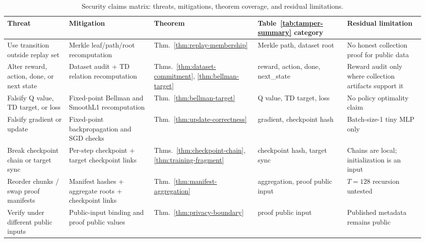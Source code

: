 \begin{table}[!t]
\centering
\small
\caption{Security claims matrix: threats, mitigations, theorem coverage, and residual limitations.}
\label{tab:security-claims}
\begin{tabular}{p{2.8cm} p{3.8cm} p{1.8cm} p{2.8cm} p{3.6cm}}
\toprule
\textbf{Threat} & \textbf{Mitigation} & \textbf{Theorem} &
\textbf{Table~\ref{tab:tamper-summary} category} & \textbf{Residual limitation} \\
\midrule
Use transition outside replay set &
Merkle leaf/path/root recomputation &
Thm.~\ref{thm:replay-membership} &
Merkle path, dataset root &
No honest collection proof for public data \\
\midrule
Alter reward, action, done, or next state &
Dataset audit + TD relation recomputation &
Thms.~\ref{thm:dataset-commitment}, \ref{thm:bellman-target} &
reward, action, done, next\_state &
Reward audit only where collection artifacts support it \\
\midrule
Falsify Q value, TD target, or loss &
Fixed-point Bellman and SmoothL1 recomputation &
Thm.~\ref{thm:bellman-target} &
Q value, TD target, loss &
No policy optimality claim \\
\midrule
Falsify gradient or update &
Fixed-point backpropagation and SGD checks &
Thm.~\ref{thm:update-correctness} &
gradient, checkpoint hash &
Batch-size-1 tiny MLP only \\
\midrule
Break checkpoint chain or target sync &
Per-step checkpoint + target checkpoint links &
Thms.~\ref{thm:checkpoint-chain}, \ref{thm:training-fragment} &
checkpoint hash, target sync &
Chains are local; initialization is an input \\
\midrule
Reorder chunks / swap proof manifests &
Manifest hashes + aggregate roots + checkpoint links &
Thm.~\ref{thm:manifest-aggregation} &
aggregation, proof public input &
$T = 128$ recursion untested \\
\midrule
Verify under different public inputs &
Public-input binding and proof public values &
Thm.~\ref{thm:privacy-boundary} &
proof public input &
Published metadata remains public \\
\bottomrule
\end{tabular}
\end{table}
